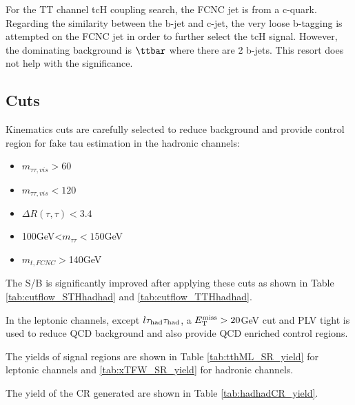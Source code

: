 For the TT channel tcH coupling search, the FCNC jet is from a c-quark. Regarding the similarity between the b-jet and c-jet, the very loose b-tagging is attempted on the FCNC jet in order to further select the tcH signal. However, the dominating background is $\ttbar$ where there are 2 b-jets. This resort does not help with the significance.

\subsection{Cuts}
\label{sec:cuts}

Kinematics cuts are carefully selected to reduce background and provide control region for fake tau estimation in the hadronic channels:
\begin{itemize}
  \item $m_{\tau\tau,vis}>60$
  \item $m_{\tau\tau,vis}<120$
  \item $\Delta R(\tau,\tau)<3.4$
  \item 100GeV<$m_{\tau\tau}<150$GeV
  \item $m_{t,FCNC}>$140GeV
\end{itemize}

The S/B is significantly improved after applying these cuts as shown in Table \ref{tab:cutflow_STHhadhad} and \ref{tab:cutflow_TTHhadhad}.

In the leptonic channels, except $l\tau_\text{had}{}\tau_\text{had}$, a $E_{\text{T}}^{\text{miss}}>20$GeV cut and PLV tight is used to reduce QCD background and also provide QCD enriched control regions.

The yields of signal regions are shown in Table \ref{tab:tthML_SR_yield} for leptonic channels and \ref{tab:xTFW_SR_yield} for hadronic channels.

The yield of the CR generated are shown in Table \ref{tab:hadhadCR_yield}.